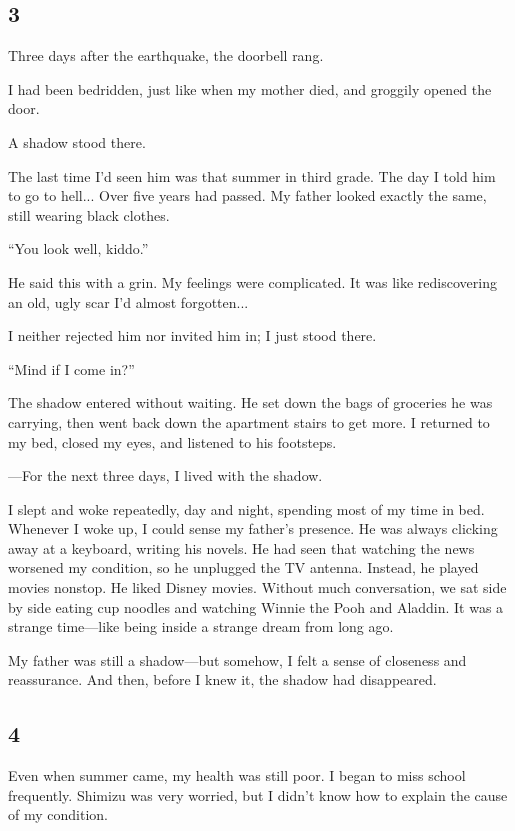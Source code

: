 \documentclass[
    a4paper,
    12pt,
    twoside,
    openany,
    UTF8,
    fontset=windows
]{ctexbook}
\begin{document}
\subsection*{3}

Three days after the earthquake, the doorbell rang.

I had been bedridden, just like when my mother died, and groggily opened the door.

A shadow stood there.

The last time I'd seen him was that summer in third grade. The day I told him to go to hell... Over five years had passed. My father looked exactly the same, still wearing black clothes.

``You look well, kiddo.''

He said this with a grin. My feelings were complicated. It was like rediscovering an old, ugly scar I'd almost forgotten...

I neither rejected him nor invited him in; I just stood there.

``Mind if I come in?''

The shadow entered without waiting. He set down the bags of groceries he was carrying, then went back down the apartment stairs to get more. I returned to my bed, closed my eyes, and listened to his footsteps.

---For the next three days, I lived with the shadow.

I slept and woke repeatedly, day and night, spending most of my time in bed. Whenever I woke up, I could sense my father's presence. He was always clicking away at a keyboard, writing his novels. He had seen that watching the news worsened my condition, so he unplugged the TV antenna. Instead, he played movies nonstop. He liked Disney movies. Without much conversation, we sat side by side eating cup noodles and watching Winnie the Pooh and Aladdin. It was a strange time---like being inside a strange dream from long ago.

My father was still a shadow---but somehow, I felt a sense of closeness and reassurance. And then, before I knew it, the shadow had disappeared.


\subsection*{4}

Even when summer came, my health was still poor. I began to miss school frequently. Shimizu was very worried, but I didn't know how to explain the cause of my condition.
\end{document}
